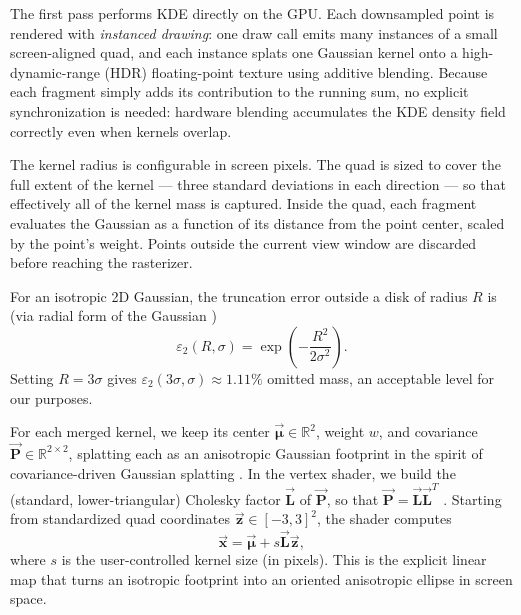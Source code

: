 \documentclass[10pt,conference]{IEEEtran}
\begin{document}
The first pass performs KDE directly on the GPU. Each downsampled point is rendered with \emph{instanced drawing}: one draw call emits many instances of a small screen-aligned quad, and each instance splats one Gaussian kernel onto a high-dynamic-range (HDR) floating-point texture using additive blending. Because each fragment simply adds its contribution to the running sum, no explicit synchronization is needed: hardware blending accumulates the KDE density field correctly even when kernels overlap.

The kernel radius is configurable in screen pixels. The quad is sized to cover the full extent of the kernel --- three standard deviations in each direction --- so that effectively all of the kernel mass is captured. Inside the quad, each fragment evaluates the Gaussian as a function of its distance from the point center, scaled by the point's weight. Points outside the current view window are discarded before reaching the rasterizer.

For an isotropic 2D Gaussian, the truncation error outside a disk of radius $R$ is (via radial form of the Gaussian \cite{Bishop2006})
\begin{equation}
\varepsilon_{2}(R,\sigma)=\exp\left(-\frac{R^2}{2\sigma^2}\right).
\end{equation}
Setting $R=3\sigma$ gives $\varepsilon_{2}(3\sigma,\sigma)\approx 1.11\%$ omitted mass, an acceptable level for our purposes.

For each merged kernel, we keep its center $\overrightarrow{\boldsymbol{\mu}}\in\mathbb{R}^2$, weight $w$, and covariance $\overrightarrow{\mathbf{P}}\in\mathbb{R}^{2\times 2}$, splatting each as an anisotropic Gaussian footprint in the spirit of covariance-driven Gaussian splatting \cite{10.1145/3592433}. In the vertex shader, we build the (standard, lower-triangular) Cholesky factor $\overrightarrow{\mathbf{L}}$ of $\overrightarrow{\mathbf{P}}$, so that $\overrightarrow{\mathbf{P}} = \overrightarrow{\mathbf{L}}\overrightarrow{\mathbf{L}}^T$ \cite{Bishop2006}. Starting from standardized quad coordinates $\overrightarrow{\boldsymbol{z}}\in[-3,3]^2$, the shader computes
\begin{equation}
\overrightarrow{\boldsymbol{x}} = \overrightarrow{\boldsymbol{\mu}} + s\overrightarrow{\mathbf{L}}\overrightarrow{\boldsymbol{z}},
\end{equation}
where $s$ is the user-controlled kernel size (in pixels). This is the explicit linear map that turns an isotropic footprint into an oriented anisotropic ellipse in screen space.
\end{document}
